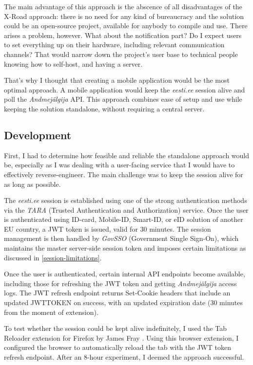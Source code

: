 The main advantage of this approach is the abscence of all disadvantages of the X-Road approach: there is no need for any kind of bureaucracy and the solution could be an open-source project, available for anybody to compile and use. There arises a problem, however. What about the notification part? Do I expect users to set everything up on their hardware, including relevant communication channels? That would narrow down the project's user base to technical people knowing how to self-host, and having a server.

That's why I thought that creating a mobile application would be the most optimal approach. A mobile application would keep the \textit{eesti.ee} session alive and poll the \textit{Andmejälgija} API. This approach combines ease of setup and use while keeping the solution standalone, without requiring a central server.

\subsection{Development}

First, I had to determine how feasible and reliable the standalone approach would be, especially as I was dealing with a user-facing service that I would have to effectively reverse-engineer. The main challenge was to keep the session alive for as long as possible.

The \textit{eesti.ee} session is established using one of the strong authentication methods via the \textit{TARA} (Trusted Authentication and Authorization) service. Once the user is authenticated using ID-card, Mobile-ID, Smart-ID, or eID solution of another EU country, a JWT token is issued, valid for 30 minutes. The session management is then handled by \textit{GovSSO} (Government Single Sign-On), which maintains the master server-side session token and imposes certain limitations as discussed in \ref{session-limitations}.

Once the user is authenticated, certain internal API endpoints become available, including those for refreshing the JWT token and getting \textit{Andmejälgija} access logs. The JWT refresh endpoint returns Set-Cookie headers that include an updated JWTTOKEN on success, with an updated expiration date (30 minutes from the moment of extension).

To test whether the session could be kept alive indefinitely, I used the Tab Reloader extension for Firefox by James Fray \cite{tab-reloader-addon}. Using this browser extension, I configured the browser to automatically reload the tab with the JWT token refresh endpoint. After an 8-hour experiment, I deemed the approach successful.

